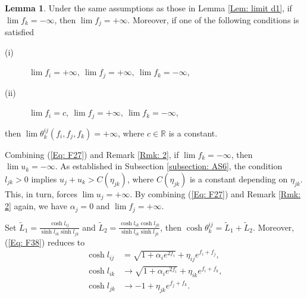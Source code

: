 \documentclass[12pt]{amsart}
\theoremstyle{definition}
\newtheorem{lemma}[theorem]{Lemma}
\begin{document}
\begin{lemma}\label{Lem: limit d2}
Under the same assumptions as those in Lemma \ref{Lem: limit d1},
if $\lim f_k=-\infty$, then $\lim f_j=+\infty$.
Moreover, if one of the following conditions is satisfied
\begin{description}
\item[(i)] $\lim f_i=+\infty,\ \lim f_j=+\infty,\ \lim f_k=-\infty$,
\item[(ii)] $\lim f_i=c,\ \lim f_j=+\infty,\ \lim f_k=-\infty$,
\end{description}
then $\lim\theta^{ij}_k(f_i,f_j,f_k)=+\infty$,
where $c\in \mathbb{R}$ is a constant.
\end{lemma}
\proof
Combining (\ref{Eq: F27}) and Remark \ref{Rmk: 2},
if $\lim f_k=-\infty$, then $\lim u_k=-\infty$.
As established in Subsection \ref{subsection: AS6}, the condition $l_{jk}>0$ implies $u_j+u_k>C(\eta_{jk})$, 
where $C(\eta_{jk})$ is a constant depending on $\eta_{jk}$.
This, in turn, forces $\lim u_j=+\infty$.
By combining (\ref{Eq: F27}) and Remark \ref{Rmk: 2} again, we have $\alpha_j=0$ and $\lim f_j=+\infty$.

Set $\widetilde{L}_1=\frac{\cosh l_{ij}}{\sinh l_{ik}\sinh l_{jk}}$ and $\widetilde{L}_2=\frac{\cosh l_{ik}\cosh l_{jk}}{\sinh l_{ik}\sinh l_{jk}}$,
then $\cosh \theta_k^{ij}=\widetilde{L}_1+\widetilde{L}_2$.
Moreover, (\ref{Eq: F38}) reduces to
\begin{equation*}
\begin{aligned}
\cosh l_{ij}
&=\sqrt{1+\alpha_ie^{2f_i}}
+\eta_{ij}e^{f_i+f_j},\\
\cosh l_{ik}
&\rightarrow\sqrt{1+\alpha_ie^{2f_i}}
+\eta_{ik}e^{f_i+f_k},\\
\cosh l_{jk}
&\rightarrow -1+\eta_{jk}e^{f_j+f_k}.
\end{aligned}
\end{equation*}
\end{document}
